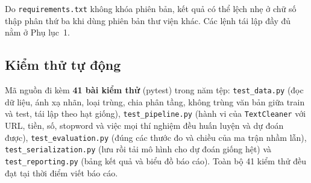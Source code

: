 Do \texttt{requirements.txt} không khóa phiên bản, kết quả có thể lệch nhẹ ở chữ số thập phân thứ ba khi dùng phiên bản thư viện khác. Các lệnh tái lập đầy đủ nằm ở Phụ lục~1.

\subsection{Kiểm thử tự động}

Mã nguồn đi kèm \textbf{41 bài kiểm thử} (pytest) trong năm tệp: \texttt{test\_data.py} (đọc dữ liệu, ánh xạ nhãn, loại trùng, chia phân tầng, không trùng văn bản giữa train và test, tái lập theo hạt giống), \texttt{test\_pipeline.py} (hành vi của \texttt{TextCleaner} với URL, tiền, số, stopword và việc mọi thí nghiệm đều huấn luyện và dự đoán được), \texttt{test\_evaluation.py} (đúng các thước đo và chiều của ma trận nhầm lẫn), \texttt{test\_serialization.py} (lưu rồi tải mô hình cho dự đoán giống hệt) và \texttt{test\_reporting.py} (bảng kết quả và biểu đồ báo cáo). Toàn bộ 41 kiểm thử đều đạt tại thời điểm viết báo cáo.
